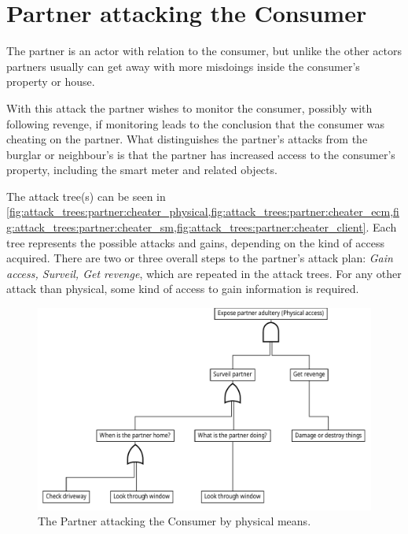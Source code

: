 
\section{Partner attacking the Consumer}
The partner is an actor with relation to the consumer, but unlike the other actors partners usually can get away with more misdoings inside the consumer's property or house.

With this attack the partner wishes to monitor the consumer, possibly with following revenge, if monitoring leads to the conclusion that the consumer was cheating on the partner.
What distinguishes the partner's attacks from the burglar or neighbour's is that the partner has increased access to the consumer's property, including the smart meter and related objects.

The attack tree(s) can be seen in \cref{fig:attack_trees:partner:cheater_physical,fig:attack_trees:partner:cheater_ecm,fig:attack_trees:partner:cheater_sm,fig:attack_trees:partner:cheater_client}.
Each tree represents the possible attacks and gains, depending on the kind of access acquired.
There are two or three overall steps to the partner's attack plan: \textit{Gain access, Surveil, Get revenge}, which are repeated in the attack trees.
For any other attack than physical, some kind of access to gain information is required.

\begin{figure}[h]
  \centering
  \includegraphics[width=.75\textwidth]{figures/graphviz/partner_vs_consumer_physical.pdf}
  \caption{The Partner attacking the Consumer by physical means.}
  \label{fig:attack_trees:partner:cheater_physical}
\end{figure}

